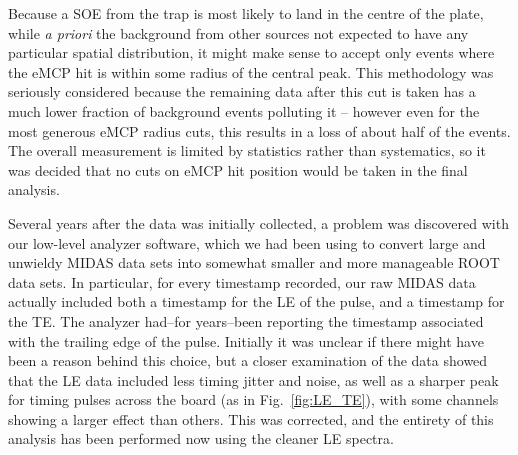 Because a SOE from the trap is most likely to land in the centre of the plate, while \emph{a priori} the background from other sources not expected to have any particular spatial distribution,  it might make sense to accept only events where the eMCP hit is within some radius of the central peak.  This methodology was seriously considered because the remaining data after this cut is taken has a much lower fraction of background events polluting it -- however even for the most generous eMCP radius cuts, this results in a loss of about half of the events.  The overall measurement is limited by statistics rather than systematics, so it was decided that no cuts on eMCP hit position would be taken in the final analysis.


Several years after the data was initially collected, a problem was discovered with our low-level analyzer software, which we had been using to convert large and unwieldy MIDAS data sets into somewhat smaller and more manageable ROOT data sets.  In particular, for every timestamp recorded, our raw MIDAS data actually included both a timestamp for the \ac{LE} of the pulse, and a timestamp for the \ac{TE}.  The analyzer had--for years--been reporting the timestamp associated with the trailing edge of the pulse.  Initially it was unclear if there might have been a reason behind this choice, but a closer examination of the data showed that the LE data included less timing jitter and noise, as well as a sharper peak for timing pulses across the board (as in Fig.~\ref{fig:LE_TE}), with some channels showing a larger effect than others.  This was corrected, and the entirety of this analysis has been performed now using the cleaner LE spectra.  

